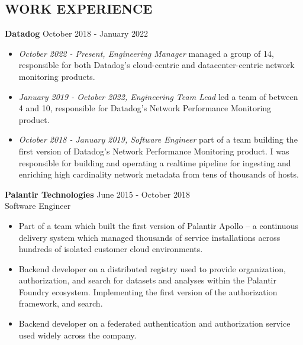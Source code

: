 \documentclass[line,margin]{res}
\begin{document}
\address{leeavital@gmail.com}

\begin{resume}

\section{WORK EXPERIENCE}

{\bf Datadog} \hfill October 2018 - January 2022 \\
\begin{itemize}
  \item \textit{October 2022 - Present, Engineering Manager} managed a group of 14, responsible for both Datadog's cloud-centric and datacenter-centric network monitoring products.
  \item \textit{January 2019 - October 2022, Engineering Team Lead} led a team of between 4 and 10, responsible for Datadog's Network Performance Monitoring product.
  \item \textit{October 2018 - January 2019, Software Engineer} part of a team building the first version of Datadog's Network Performance Monitoring product. I was responsible for building and operating a realtime pipeline for ingesting and enriching high cardinality network metadata from tens of thousands of hosts.
\end{itemize}

{\bf Palantir Technologies} \hfill June 2015 - October 2018 \\
Software Engineer
\begin{itemize}
\item Part of a team which built the first version of Palantir Apollo -- a continuous delivery system which managed thousands of service installations across hundreds of isolated customer cloud environments.
\item Backend developer on a distributed registry used to provide organization, authorization, and search for datasets and analyses within the Palantir Foundry ecosystem. Implementing the first version of the authorization framework, and search.
\item Backend developer on a federated authentication and authorization service used widely across the company.
\end{itemize}



\end{resume}
\end{document}
